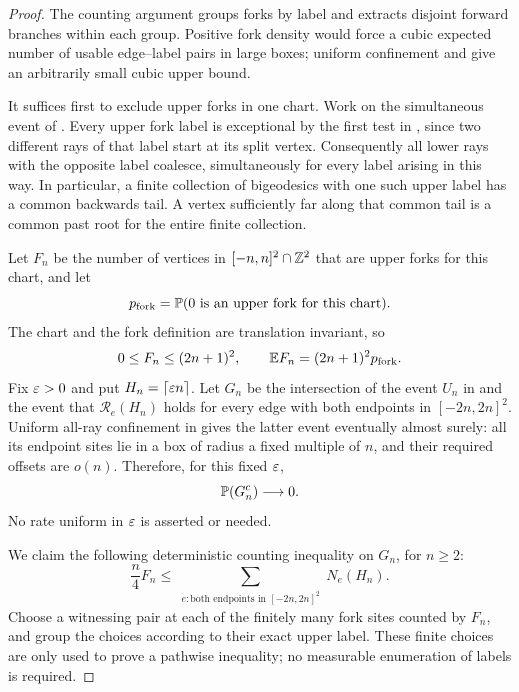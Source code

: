 \begin{proof}
The counting argument groups forks by label and extracts disjoint
forward branches within each group. Positive fork density would force
a cubic expected number of usable edge--label pairs in large boxes;
uniform confinement and  give an arbitrarily small
cubic upper bound.

It suffices first to exclude upper forks in one chart.  Work on the
simultaneous event of .  Every upper fork
label is exceptional by the first test in
, since two different rays of that label
start at its split vertex.  Consequently all lower rays with the
opposite label coalesce, simultaneously for every label arising in this
way.  In particular, a finite collection of bigeodesics with one such
upper label has a common backwards tail.  A vertex sufficiently far
along that common tail is a common past root for the entire finite
collection.

Let $F_n$ be the number of vertices in $[-n,n]^2\cap\mathbb Z^2$ that are upper
forks for this chart, and let
\[
 p_{\mathrm{fork}}=\mathbb P(0\text{ is an upper fork for this chart}).
\]
The chart and the fork definition are translation invariant, so
\begin{equation}\label{eq:fork-count-mean}
 0\le F_n\le(2n+1)^2,
 \qquad \mathbb E F_n=(2n+1)^2p_{\mathrm{fork}}.
\end{equation}
Fix $\varepsilon>0$ and put $H_n=\lceil\varepsilon n\rceil$.  Let $G_n$ be the
intersection of the event $U_n$ in  and the event that
$\mathcal R_e(H_n)$ holds for every edge with both endpoints in
$[-2n,2n]^2$.  Uniform all-ray confinement in  gives
the latter event eventually almost surely: all its endpoint sites lie in
a box of radius a fixed multiple of $n$, and their required offsets are
$o(n)$.  Therefore, for this fixed $\varepsilon$,
\begin{equation}\label{eq:fork-good-event}
 \mathbb P(G_n^c)\longrightarrow0.
\end{equation}
No rate uniform in $\varepsilon$ is asserted or needed.

We claim the following deterministic counting inequality on $G_n$, for
$n\ge2$:
\begin{equation}\label{eq:fork-edge-credit}
 \frac n4 F_n
 \le\sum_{\substack{e:\text{both endpoints in }[-2n,2n]^2}}
          N_e(H_n).
\end{equation}
Choose a witnessing pair at each of the finitely many fork sites counted
by $F_n$, and group the choices according to their exact upper label.
These finite choices are only used to prove a pathwise inequality; no
measurable enumeration of labels is required.


\end{proof}
